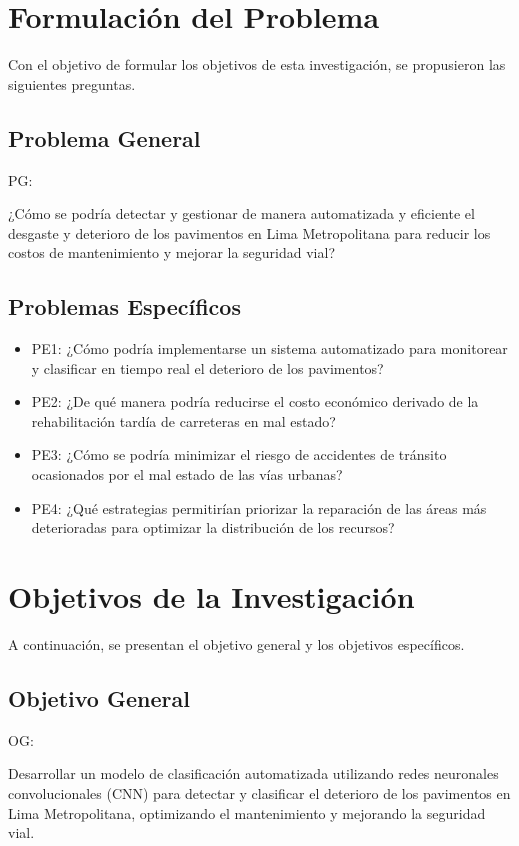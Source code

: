 	\section{Formulación del Problema}
	Con el objetivo de formular los objetivos de esta investigación, se propusieron las siguientes preguntas.
	\subsection{Problema General}
	PG: \newcommand{\ProblemaGeneral}{
	¿Cómo se podría detectar y gestionar de manera automatizada y eficiente el desgaste y deterioro de los pavimentos en Lima Metropolitana para reducir los costos de mantenimiento y mejorar la seguridad vial?
	}
	\ProblemaGeneral
	\subsection{Problemas Específicos}
	\newcommand{\Pbone}{
	¿Cómo podría implementarse un sistema automatizado para monitorear y clasificar en tiempo real el deterioro de los pavimentos?
	}
	\newcommand{\Pbtwo}{
	¿De qué manera podría reducirse el costo económico derivado de la rehabilitación tardía de carreteras en mal estado?
	}
	\newcommand{\Pbthree}{
	¿Cómo se podría minimizar el riesgo de accidentes de tránsito ocasionados por el mal estado de las vías urbanas?
	}
	\newcommand{\Pbfour}{
	¿Qué estrategias permitirían priorizar la reparación de las áreas más deterioradas para optimizar la distribución de los recursos?
	}

	\begin{itemize}
		\item PE1: {\Pbone}
		\item PE2: {\Pbtwo}
		\item PE3: {\Pbthree}
		\item PE4: {\Pbfour}
	\end{itemize}

	\section{Objetivos de la Investigación}
	A continuación, se presentan el objetivo general y los objetivos específicos.
	\subsection{Objetivo General}
	OG: \newcommand{\ObjetivoGeneral}{
	Desarrollar un modelo de clasificación automatizada utilizando redes neuronales convolucionales (CNN) para detectar y clasificar el deterioro de los pavimentos en Lima Metropolitana, optimizando el mantenimiento y mejorando la seguridad vial.
	}
	\ObjetivoGeneral
